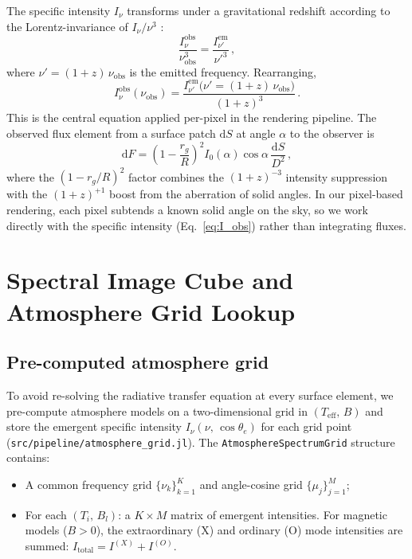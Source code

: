 The specific intensity $I_\nu$ transforms under a gravitational redshift
according to the Lorentz-invariance of $I_\nu / \nu^{3}$
\citep[see e.g.][Sect.~3]{beloborodov_2002}:
\begin{equation}
  \frac{I_\nu^{\mathrm{obs}}}{\nu_{\mathrm{obs}}^{3}}
    = \frac{I_{\nu'}^{\mathrm{em}}}{\nu'^{3}}\,,
  \label{eq:invariant}
\end{equation}
where $\nu' = (1+z)\,\nu_{\mathrm{obs}}$ is the emitted frequency.
Rearranging,
\begin{equation}
  \boxed{I_\nu^{\mathrm{obs}}(\nu_{\mathrm{obs}})
    = \frac{I_{\nu'}^{\mathrm{em}}\!\bigl(\nu' = (1{+}z)\,\nu_{\mathrm{obs}}\bigr)}
           {(1 + z)^{3}}\,.}
  \label{eq:I_obs}
\end{equation}
This is the central equation applied per-pixel in the rendering pipeline.
The observed flux element from a surface patch $\mathrm{d}S$ at angle
$\alpha$ to the observer is \citep[Eq.~4]{beloborodov_2002}
\begin{equation}
  \mathrm{d}F = \left(1 - \frac{r_g}{R}\right)^{\!2}
    I_0(\alpha)\cos\alpha\,\frac{\mathrm{d}S}{D^{2}}\,,
  \label{eq:dF_beloborodov}
\end{equation}
where the $(1 - r_g/R)^{2}$ factor combines the $(1+z)^{-3}$ intensity
suppression with the $(1+z)^{+1}$ boost from the aberration of solid angles.
In our pixel-based rendering, each pixel subtends a known solid angle on
the sky, so we work directly with the specific intensity
(Eq.~\ref{eq:I_obs}) rather than integrating fluxes.


\section{Spectral Image Cube and Atmosphere Grid Lookup}
\label{sec:atmosphere_grid}

\subsection{Pre-computed atmosphere grid}

To avoid re-solving the radiative transfer equation at every surface element,
we pre-compute atmosphere models on a two-dimensional grid in
$(T_{\mathrm{eff}},\,B)$ and store the emergent specific intensity
$I_\nu(\nu,\,\cos\theta_e)$ for each grid point
(\texttt{src/pipeline/atmosphere\_grid.jl}).  The \texttt{AtmosphereSpectrumGrid}
structure contains:
\begin{itemize}
  \item A common frequency grid $\{\nu_k\}_{k=1}^{K}$ and angle-cosine grid
    $\{\mu_j\}_{j=1}^{M}$;
  \item For each $(T_i,\,B_l)$: a $K \times M$ matrix of emergent intensities.
    For magnetic models ($B > 0$), the extraordinary (X) and ordinary (O)
    mode intensities are summed:
    $I_{\mathrm{total}} = I^{(X)} + I^{(O)}$.
\end{itemize}

